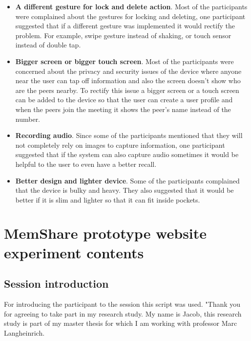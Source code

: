 \documentclass[mscthesis]{usiinfthesis}
\begin{document}
\begin{itemize}
\item \textbf{A different gesture for lock and delete action}. Most of the participants were complained about the gestures for locking and deleting, one participant suggested that if a different gesture was implemented it would rectify the problem. For example, swipe gesture instead of shaking, or touch sensor instead of double tap.
\item \textbf{Bigger screen or bigger touch screen}. Most of the participants were concerned about the privacy and security issues of the device where anyone near the user can tap off information and also the screen doesn't show who are the peers nearby. To rectify this issue a bigger screen or a touch screen can be added to the device so that the user can create a user profile and when the peers join the meeting it shows the peer's name instead of the number.  
\item \textbf{Recording audio}. Since some of the participants mentioned that they will not completely rely on images to capture information, one participant suggested that if the system can also capture audio sometimes it would be helpful to the user to even have a better recall. 
\item \textbf{Better design and lighter device}. Some of the participants complained that the device is bulky and heavy. They also suggested that it would be better if it is slim and lighter so that it can fit inside pockets. 
\end{itemize}


\appendix 

\chapter{MemShare prototype website experiment contents}


\label{sec:consent}

\section{Session introduction}
\label{sec:sess}
For introducing the participant to the session this script was used.
\linebreak
"Thank you for agreeing to take part in my research study. My name is Jacob, this research study is part of my master thesis for which I am working with professor Marc Langheinrich.
\end{document}
